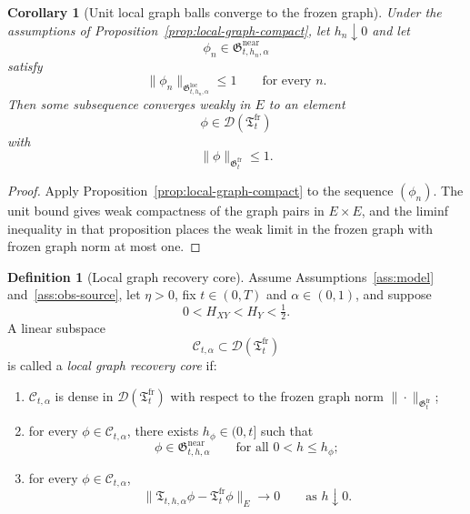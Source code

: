 \documentclass[11pt,a4paper]{amsart}
\theoremstyle{plain}
\newtheorem{corollary}[theorem]{Corollary}
\theoremstyle{definition}
\newtheorem{definition}[theorem]{Definition}
\theoremstyle{remark}
\begin{document}
\begin{corollary}[Unit local graph balls converge to the frozen graph]
\label{cor:local-unit-ball}
Under the assumptions of Proposition~\ref{prop:local-graph-compact}, let \(h_n\downarrow0\) and
let
\[
\phi_n\in\mathfrak G_{t,h_n,\alpha}^{\mathrm{near}}
\]
satisfy
\[
\|\phi_n\|_{\mathfrak G_{t,h_n,\alpha}^{\mathrm{loc}}}\le 1
\qquad\text{for every }n.
\]
Then some subsequence converges weakly in \(E\) to an element
\[
\phi\in\mathcal D(\mathfrak T_t^{\mathrm{fr}})
\]
with
\[
\|\phi\|_{\mathfrak G_t^{\mathrm{fr}}}\le 1.
\]
\end{corollary}

\begin{proof}
Apply Proposition~\ref{prop:local-graph-compact} to the sequence \((\phi_n)\). The unit bound gives
weak compactness of the graph pairs in \(E\times E\), and the liminf inequality in that proposition
places the weak limit in the frozen graph with frozen graph norm at most one.
\end{proof}

\begin{definition}[Local graph recovery core]\label{def:local-recovery-core}
Assume Assumptions~\ref{ass:model} and~\ref{ass:obs-source}, let \(\eta>0\), fix \(t\in(0,T)\)
and \(\alpha\in(0,1)\), and suppose
\[
0<H_{XY}<H_Y<\tfrac12.
\]
A linear subspace
\[
\mathcal C_{t,\alpha}\subset \mathcal D(\mathfrak T_t^{\mathrm{fr}})
\]
is called a \emph{local graph recovery core} if:
\begin{enumerate}[label=(\roman*)]
\item \(\mathcal C_{t,\alpha}\) is dense in \(\mathcal D(\mathfrak T_t^{\mathrm{fr}})\) with respect
to the frozen graph norm \(\|\cdot\|_{\mathfrak G_t^{\mathrm{fr}}}\);
\item for every \(\phi\in\mathcal C_{t,\alpha}\), there exists \(h_\phi\in(0,t]\) such that
\[
\phi\in \mathfrak G_{t,h,\alpha}^{\mathrm{near}}
\qquad\text{for all }0<h\le h_\phi;
\]
\item for every \(\phi\in\mathcal C_{t,\alpha}\),
\begin{equation}\label{eq:recovery-strong}
\|\mathfrak T_{t,h,\alpha}\phi-\mathfrak T_t^{\mathrm{fr}}\phi\|_E\longrightarrow 0
\qquad\text{as }h\downarrow0.
\end{equation}
\end{enumerate}
\end{definition}
\end{document}
